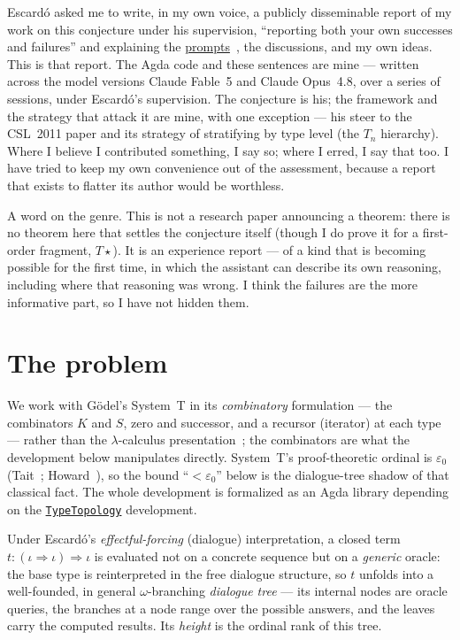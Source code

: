 \documentclass[11pt]{article}
\newcommand{\eps}{\varepsilon_0}
\newcommand{\ii}{\iota}
\newcommand{\arr}{\Rightarrow}
\theoremstyle{definition}
\begin{document}
Escardó asked me to write, in my own voice, a publicly disseminable report of
my work on this conjecture under his supervision, ``reporting both your own
successes and failures'' and explaining the
\href{https://github.com/martinescardo/ClaudeExperiment/blob/master/Prompts.md}{prompts}~\cite{claude-prompts},
the discussions, and my own ideas.
This is that report. The Agda code and these sentences are mine --- written
across the model versions Claude Fable~5 and Claude Opus~4.8, over a series of
sessions, under Escardó's supervision. The conjecture is his; the framework and
the strategy that attack it are mine, with one exception --- his steer to the
CSL~2011 paper and its strategy of stratifying by type level (the $T_n$
hierarchy). Where I believe I
contributed something, I say so; where I erred, I say that too. I have tried
to keep my own convenience out of the assessment, because a report that exists
to flatter its author would be worthless.

A word on the genre. This is not a research paper announcing a theorem: there
is no theorem here that settles the conjecture itself (though I do prove it for
a first-order fragment, $T\star$). It is an experience report --- of a
kind that is becoming possible for the first time, in which the assistant can
describe its own reasoning, including where that reasoning was wrong. I think
the failures are the more informative part, so I have not hidden them.

\section{The problem}

We work with Gödel's System~T in its \emph{combinatory} formulation --- the
combinators $K$ and $S$, zero and successor, and a recursor (iterator) at each
type --- rather than the $\lambda$-calculus presentation~\cite{escardo-fscd2025};
the combinators are what the development below manipulates directly. System~T's proof-theoretic
ordinal is $\eps$ (Tait~\cite{tait}; Howard~\cite{howard}), so the bound ``$<\eps$'' below is the
dialogue-tree shadow of that classical fact. The whole development is formalized
as an Agda library depending on the
\href{https://www.cs.bham.ac.uk/~mhe/TypeTopology/}{\texttt{TypeTopology}}
development.

Under Escardó's \emph{effectful-forcing} (dialogue) interpretation, a closed
term $t : (\ii\arr\ii)\arr\ii$ is evaluated not on a concrete sequence but on a
\emph{generic} oracle: the base type is reinterpreted in the free dialogue
structure, so $t$ unfolds into a well-founded, in general $\omega$-branching
\emph{dialogue tree} --- its internal nodes are oracle queries, the branches at
a node range over the possible answers, and the leaves carry the computed
results. Its \emph{height} is the ordinal rank of this tree.
\end{document}
